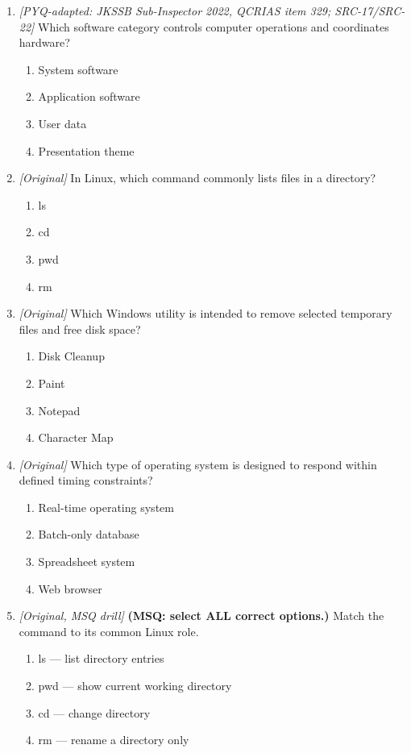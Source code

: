 \begin{enumerate}[label=\textbf{Q\arabic*.}, leftmargin=*]
\begin{enumerate}[label=\Alph*.]
    \item Formatting a disk installs a new monitor.
  \end{enumerate}
\item \textit{[PYQ-adapted: JKSSB Sub-Inspector 2022, QCRIAS item 329; SRC-17/SRC-22]} Which software category controls computer operations and coordinates hardware?
  \begin{enumerate}[label=\Alph*.]
\item System software
   \item Application software
   \item User data
   \item Presentation theme
  \end{enumerate}

\item \textit{[Original]} In Linux, which command commonly lists files in a directory?
  \begin{enumerate}[label=\Alph*.]
\item ls
   \item cd
   \item pwd
   \item rm
  \end{enumerate}

\item \textit{[Original]} Which Windows utility is intended to remove selected temporary files and free disk space?
  \begin{enumerate}[label=\Alph*.]
\item Disk Cleanup
   \item Paint
   \item Notepad
   \item Character Map
  \end{enumerate}

\item \textit{[Original]} Which type of operating system is designed to respond within defined timing constraints?
  \begin{enumerate}[label=\Alph*.]
\item Real-time operating system
   \item Batch-only database
   \item Spreadsheet system
   \item Web browser
  \end{enumerate}

\item \textit{[Original, MSQ drill]} \textbf{(MSQ: select ALL correct options.)} Match the command to its common Linux role.
  \begin{enumerate}[label=\Alph*.]
\item ls --- list directory entries
   \item pwd --- show current working directory
   \item cd --- change directory
   \item rm --- rename a directory only
  \end{enumerate}

\end{enumerate}
